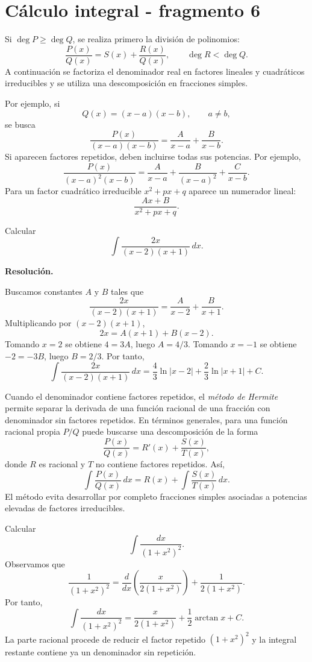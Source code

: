 \section{Cálculo integral - fragmento 6}
Si $\deg P\geq\deg Q$, se realiza primero la división de polinomios:
\[
\frac{P(x)}{Q(x)}=S(x)+\frac{R(x)}{Q(x)},
\qquad \deg R<\deg Q.
\]
A continuación se factoriza el denominador real en factores lineales y cuadráticos irreducibles y se utiliza una descomposición en fracciones simples.

Por ejemplo, si
\[
Q(x)=(x-a)(x-b),\qquad a\neq b,
\]
se busca
\[
\frac{P(x)}{(x-a)(x-b)}
=
\frac{A}{x-a}+\frac{B}{x-b}.
\]
Si aparecen factores repetidos, deben incluirse todas sus potencias. Por ejemplo,
\[
\frac{P(x)}{(x-a)^2(x-b)}
=
\frac{A}{x-a}+\frac{B}{(x-a)^2}+\frac{C}{x-b}.
\]
Para un factor cuadrático irreducible $x^2+px+q$ aparece un numerador lineal:
\[
\frac{Ax+B}{x^2+px+q}.
\]

\begin{solvedexercise}
Calcular
\[
\int\frac{2x}{(x-2)(x+1)}\,dx.
\]

\textbf{Resolución.}\par\smallskip
Buscamos constantes $A$ y $B$ tales que
\[
\frac{2x}{(x-2)(x+1)}
=
\frac{A}{x-2}+\frac{B}{x+1}.
\]
Multiplicando por $(x-2)(x+1)$,
\[
2x=A(x+1)+B(x-2).
\]
Tomando $x=2$ se obtiene $4=3A$, luego $A=4/3$. Tomando $x=-1$ se obtiene $-2=-3B$, luego $B=2/3$. Por tanto,
\[
\int\frac{2x}{(x-2)(x+1)}\,dx
=
\frac43\ln|x-2|+\frac23\ln|x+1|+C.
\]
\end{solvedexercise}

Cuando el denominador contiene factores repetidos, el \emph{método de Hermite} permite separar la derivada de una función racional de una fracción con denominador sin factores repetidos. En términos generales, para una función racional propia $P/Q$ puede buscarse una descomposición de la forma
\[
\frac{P(x)}{Q(x)}
=
R'(x)+\frac{S(x)}{T(x)},
\]
donde $R$ es racional y $T$ no contiene factores repetidos. Así,
\[
\int\frac{P(x)}{Q(x)}\,dx
=
R(x)+\int\frac{S(x)}{T(x)}\,dx.
\]
El método evita desarrollar por completo fracciones simples asociadas a potencias elevadas de factores irreducibles.

\begin{example}
Calcular
\[
\int\frac{dx}{(1+x^2)^2}.
\]
Observamos que
\[
\frac{1}{(1+x^2)^2}
=
\frac{d}{dx}\left(\frac{x}{2(1+x^2)}\right)
+
\frac{1}{2(1+x^2)}.
\]
Por tanto,
\[
\int\frac{dx}{(1+x^2)^2}
=
\frac{x}{2(1+x^2)}+\frac12\arctan x+C.
\]
La parte racional procede de reducir el factor repetido $(1+x^2)^2$ y la integral restante contiene ya un denominador sin repetición.
\end{example}


